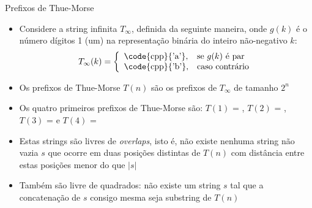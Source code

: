 \begin{frame}[fragile]{Prefixos de Thue-Morse}

    \begin{itemize}
        \item Considere a string infinita $T_\infty$, definida da seguinte maneira, onde $g(k)$ é 
            o número dígitos 1 (um) na representação binária do inteiro não-negativo $k$:
        \[
            T_\infty(k) = \left\lbrace \begin{array}{ll} \mbox{\code{cpp}{'a'}}, & \mbox{se}\ g(k)\ \mbox{é par} \\
            \mbox{\code{cpp}{'b'}},& \mbox{caso contrário} \end{array} \right.
        \]
        \pause

        \item Os prefixos de Thue-Morse $T(n)$ são os prefixos de $T_\infty$ de tamanho $2^n$
        \pause

        \item Os quatro primeiros prefixos de Thue-Morse são: $T(1)$ = , $T(2)$ = , $T(3)$ =  e 
            $T(4)$ =  
        \pause

        \item Estas strings são livres de \textit{overlaps}, isto é, não existe nenhuma string não 
            vazia $s$ que ocorre em duas posições distintas de $T(n)$ com distância entre estas 
            posições menor do que $|s|$
        \pause

        \item Também são livre de quadrados: não existe um string $s$ tal que a concatenação de 
            $s$ consigo mesma seja substring de $T(n)$
    \end{itemize}

\end{frame}

